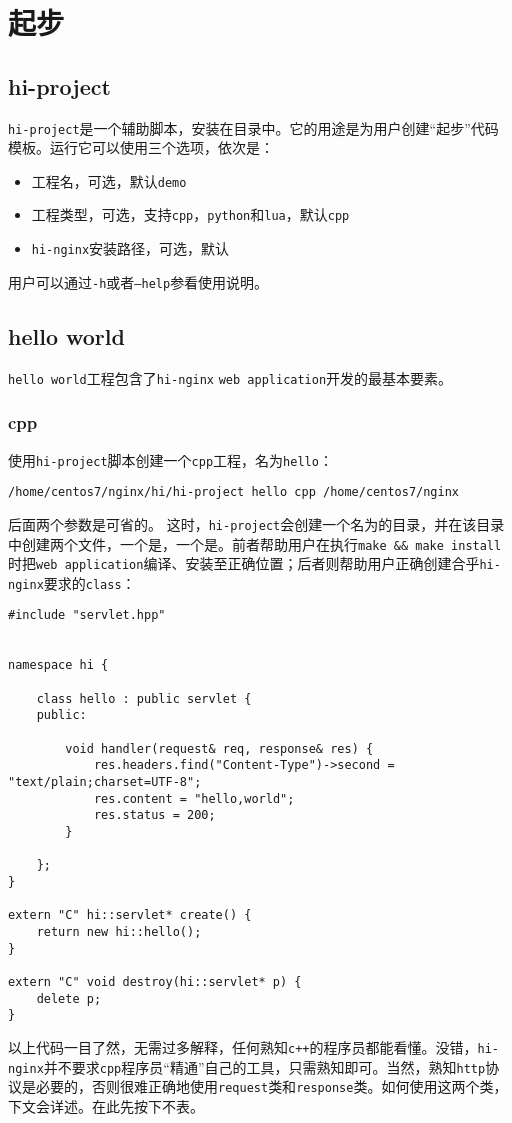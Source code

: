 \section{起步}
\subsection{hi-project}
\texttt{hi-project}是一个辅助脚本，安装在目录中。它的用途是为用户创建“起步”代码模板。运行它可以使用三个选项，依次是：
\begin{itemize}
\item 工程名，可选，默认\texttt{demo}
\item 工程类型，可选，支持\texttt{cpp}，\texttt{python}和\texttt{lua}，默认\texttt{cpp}
\item \texttt{hi-nginx}安装路径，可选，默认
\end{itemize}
用户可以通过\texttt{-h}或者\texttt{--help}参看使用说明。


\subsection{hello world}
\texttt{hello world}工程包含了\texttt{hi-nginx} \texttt{web application}开发的最基本要素。
\subsubsection{cpp}
使用\texttt{hi-project}脚本创建一个\texttt{cpp}工程，名为\texttt{hello}：
\begin{lstlisting}
/home/centos7/nginx/hi/hi-project hello cpp /home/centos7/nginx
\end{lstlisting}
后面两个参数是可省的。
这时，\texttt{hi-project}会创建一个名为的目录，并在该目录中创建两个文件，一个是，一个是。前者帮助用户在执行\texttt{make \&\& make install }时把\texttt{web application}编译、安装至正确位置；后者则帮助用户正确创建合乎\texttt{hi-nginx}要求的\texttt{class}：
\begin{lstlisting}
#include "servlet.hpp"


namespace hi {

    class hello : public servlet {
    public:

        void handler(request& req, response& res) {
            res.headers.find("Content-Type")->second = "text/plain;charset=UTF-8";
            res.content = "hello,world";
            res.status = 200;
        }

    };
}

extern "C" hi::servlet* create() {
    return new hi::hello();
}

extern "C" void destroy(hi::servlet* p) {
    delete p;
}
\end{lstlisting}
以上代码一目了然，无需过多解释，任何熟知\texttt{c++}的程序员都能看懂。没错，\texttt{hi-nginx}并不要求\texttt{cpp}程序员“精通”自己的工具，只需熟知即可。当然，熟知\texttt{http}协议是必要的，否则很难正确地使用\texttt{request}类和\texttt{response}类。如何使用这两个类，下文会详述。在此先按下不表。

